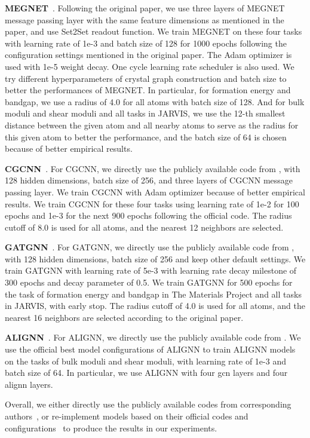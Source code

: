 \documentclass{article}
\begin{document}
\textbf{MEGNET}~\citep{megnet}. Following the original paper, we use three layers of MEGNET message passing layer with the same feature dimensions as mentioned in the paper, and use Set2Set readout function. We train MEGNET on these four tasks with learning rate of 1e-3 and batch size of 128 for 1000 epochs following the configuration settings mentioned in the original paper. The Adam optimizer is used with 1e-5 weight decay. One cycle learning rate scheduler is also used. We try different hyperparameters of crystal graph construction and batch size to better the performances of MEGNET. In particular, for formation energy and bandgap, we use a radius of 4.0 for all atoms with batch size of 128. And for bulk moduli and shear moduli and all tasks in JARVIS, we use the 12-th smallest distance between the given atom and all nearby atoms to serve as the radius for this given atom to better the performance, and the batch size of 64 is chosen because of better empirical results.

\textbf{CGCNN}~\citep{cgcnn}. For CGCNN, we directly use the publicly available code from \citet{cgcnn}, with 128 hidden dimensions, batch size of 256, and three layers of CGCNN message passing layer. We train CGCNN with Adam optimizer because of better empirical results. We train CGCNN for these four tasks using learning rate of 1e-2 for 100 epochs and 1e-3 for the next 900 epochs following the official code. The radius cutoff of 8.0 is used for all atoms, and the nearest 12 neighbors are selected.

\textbf{GATGNN}~\citep{gatgnn}. For GATGNN, we directly use the publicly available code from \citet{gatgnn}, with 128 hidden dimensions, batch size of 256 and keep other default settings. We train GATGNN with learning rate of 5e-3 with learning rate decay milestone of 300 epochs and decay parameter of 0.5. We train GATGNN for 500 epochs for the task of formation energy and bandgap in The Materials Project and all tasks in JARVIS, with early stop. The radius cutoff of 4.0 is used for all atoms, and the nearest 16 neighbors are selected according to the original paper.

\textbf{ALIGNN}~\citep{alignn}. For ALIGNN, we directly use the publicly available code from \citet{alignn}. We use the official best model configurations of ALIGNN to train ALIGNN models on the tasks of bulk moduli and shear moduli, with learning rate of 1e-3 and batch size of 64. In particular, we use ALIGNN with four gcn layers and four alignn layers.

Overall, we either directly use the publicly available codes from corresponding authors~\citep{cgcnn,gatgnn,alignn}, or re-implement models based on their official codes and configurations~\citep{schnet,megnet} to produce the results in our experiments.
\end{document}

